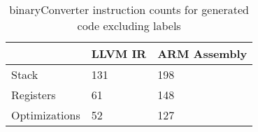 \begin{table}[h!]
\centering
\begin{tabular}{p{}p{}p{}}
  \hline
 & LLVM IR & ARM Assembly \\ 
  \hline
Stack & 131 & 198 \\ 
  Registers &  61 & 148 \\ 
  Optimizations &  52 & 127 \\ 
   \hline
\end{tabular}
\caption{binaryConverter instruction counts for generated code excluding labels}
\end{table}
